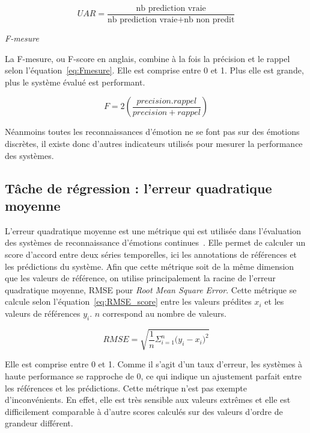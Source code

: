 \begin{equation}
  UAR = \frac{\text{nb prediction vraie}}{\text{nb prediction vraie}+ \text{nb non predit}}
  \label{eq:UAR}
\end{equation}

\vspace{1cm}
\textit{F-mesure}

La F-mesure, ou F-score en anglais, combine à la fois la précision et le rappel selon l'équation~\ref{eq:Fmesure}. Elle est comprise entre 0 et 1. Plus elle est grande, plus le système évalué est performant.

\begin{equation}
  F = 2 \left( \frac{precision.rappel}{precision+rappel} \right)
  \label{eq:Fmesure}
\end{equation}

Néanmoins toutes les reconnaissances d'émotion ne se font pas sur des émotions discrètes, il existe donc d'autres indicateurs utilisés pour mesurer la performance des systèmes.

\subsection{Tâche de régression : l'erreur quadratique moyenne}
L'erreur quadratique moyenne est une métrique qui est utilisée dans l'évaluation des systèmes de reconnaissance d'émotions continues~\cite{AVEC2017}. Elle permet de calculer un score d'accord entre deux séries temporelles, ici les annotations de références et les prédictions du système. Afin que cette métrique soit de la même dimension que les valeurs de référence, on utilise principalement la racine de l'erreur quadratique moyenne, RMSE pour \textit{Root Mean Square Error}. Cette métrique se calcule selon l'équation~\ref{eq:RMSE_score} entre les valeurs prédites $x_i$  et les valeurs de références $y_i$. $n$ correspond au nombre de valeurs.

\begin{equation}
    RMSE = \sqrt{\frac{1}{n}\Sigma_{i=1}^{n}{\Big(y_i - x_i\Big)^2}}
\label{eq:RMSE_score}
\end{equation}

Elle est comprise entre 0 et 1. Comme il s'agit d'un taux d'erreur, les systèmes à haute performance se rapproche de 0, ce qui indique un ajustement parfait entre les références et les prédictions. Cette métrique n'est pas exempte d'inconvénients. En effet, elle est très sensible aux valeurs extrêmes et elle est difficilement comparable à d'autre scores calculés sur des valeurs d'ordre de grandeur différent.

